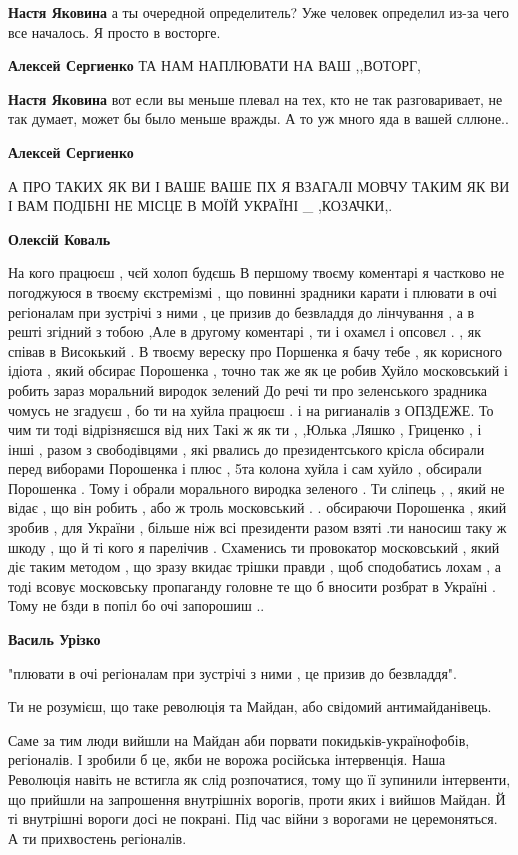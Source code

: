 \begin{itemize}
\begin{itemize}
\textbf{Настя Яковина} а ты очередной определитель? Уже человек определил из-за чего все началось. Я просто в восторге.

\textbf{Алексей Сергиенко} ТА НАМ НАПЛЮВАТИ НА ВАШ ,,ВОТОРГ,

\textbf{Настя Яковина} вот если вы меньше плевал на тех, кто не так разговаривает, не так думает, может бы было меньше вражды. А то уж много яда в вашей сллюне..

\textbf{Алексей Сергиенко} 

А ПРО ТАКИХ ЯК ВИ І ВАШЕ ВАШЕ ПХ Я ВЗАГАЛІ МОВЧУ ТАКИМ ЯК ВИ І ВАМ ПОДІБНІ НЕ
МІСЦЕ В МОЇЙ УКРАЇНІ \_ ,КОЗАЧКИ,.

\textbf{Олексій Коваль} 

На кого працюєш , чєй холоп будєшь В першому твоєму коментарі я частково не
погоджуюся в твоєму єкстремізмі , що повинні зрадники карати і плювати в очі
регіоналам при зустрічі з ними , це призив до безвладдя до лінчування , а в
решті згідний з тобою ,Але в другому коментарі , ти і охамєл і опсовєл . , як
співав в Високький . В твоєму вереску про Поршенка я бачу тебе , як корисного
ідіота , який обсирає Порошенка , точно так же як це робив Хуйло московський і
робить зараз моральний виродок зелений До речі ти про зеленського зрадника
чомусь не згадуєш , бо ти на хуйла працюєш . і на ригианалів з ОПЗДЕЖЕ. То чим
ти тоді відрізняєшся від них Такі ж як ти , ,Юлька ,Ляшко , Гриценко , і інші ,
разом з свободівцями , які рвались до президентського крісла обсирали перед
виборами Порошенка і плюс , 5та колона хуйла і сам хуйло , обсирали Порошенка .
Тому і обрали морального виродка зеленого . Ти сліпець , , який не відає , що
він робить , або ж троль московський . . обсираючи Порошенка , який зробив ,
для України , більше ніж всі президенти разом взяті .ти наносиш таку ж шкоду ,
що й ті кого я парелічив . Схаменись ти провокатор московський , який діє таким
методом , що зразу вкидає трішки правди , щоб сподобатись лохам , а тоді всовує
московську пропаганду головне те що б вносити розбрат в Україні . Тому не бзди
в попіл бо очі запорошиш ..

\textbf{Василь Урізко} 

"плювати в очі регіоналам при зустрічі з ними , це призив до безвладдя".

Ти не розумієш, що таке революція та Майдан, або свідомий антимайданівець.

Саме за тим люди вийшли на Майдан аби порвати покидьків-українофобів,
регіоналів. І зробили б це, якби не ворожа російська інтервенція. Наша
Революція навіть не встигла як слід розпочатися, тому що її зупинили
інтервенти, що прийшли на запрошення внутрішніх ворогів, проти яких і вийшов
Майдан. Й ті внутрішні вороги досі не покрані. Під час війни з ворогами не
церемоняться. А ти прихвостень регіоналів.


\end{itemize}
\end{itemize}
